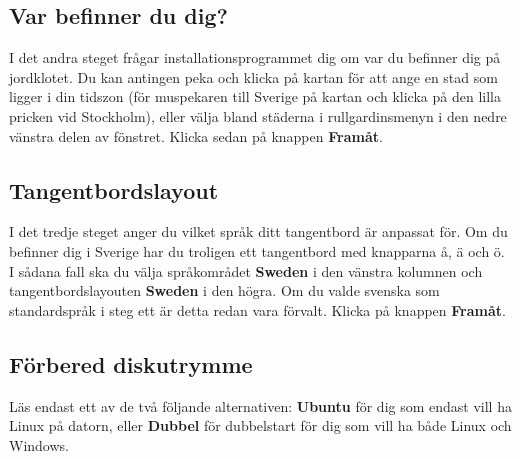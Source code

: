 \documentclass[a4paper,final]{memoir} %
\begin{document}
\subsection{Var befinner du dig?}


I det andra steget frågar installationsprogrammet dig om var du befinner dig på jordklotet. Du kan antingen peka och klicka på kartan för att ange en stad som ligger i din tidszon (för muspekaren till Sverige på kartan och klicka på den lilla pricken vid Stockholm), eller välja bland städerna i rullgardinsmenyn i den nedre vänstra delen av fönstret. Klicka sedan på knappen \textbf{Framåt}.

\subsection{Tangentbordslayout}


I det tredje steget anger du vilket språk ditt tangentbord är anpassat för. Om du befinner dig i Sverige har du troligen ett tangentbord med knapparna å, ä och ö. I sådana fall ska du välja språkområdet \textbf{Sweden} i den vänstra kolumnen och tangentbordslayouten \textbf{Sweden} i den högra. Om du valde svenska som standardspråk i steg ett är detta redan vara förvalt. Klicka på knappen \textbf{Framåt}.

\subsection{Förbered diskutrymme}\label{sec:dualboot}


Läs endast ett av de två följande alternativen: \textbf{Ubuntu} för dig som endast vill ha Linux på datorn, eller \textbf{Dubbel} för dubbelstart för dig som vill ha både Linux och Windows.

\xposskip{}
\end{document}

